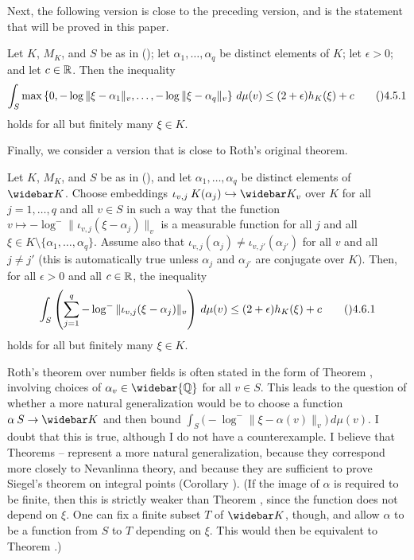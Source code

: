 Next, the following version is close to the preceding version, and is the
statement that will be proved in this paper.

  Let $K$, $M_K$, and $S$ be as in ();
let $\alpha_1,\dots,\alpha_q$ be distinct elements of $K$;
let $\epsilon>0$; and let $c\in\Bbb R$.  Then the inequality
$$\int_S \max\left\{0,
    -\log\|\xi-\alpha_1\|_v,\dots,-\log\|\xi-\alpha_q\|_v\right\}\,d\mu(v)
  \le (2+\epsilon)h_K(\xi) + c\tag\04.5.1$$
holds for all but finitely many $\xi\in K$.
\endit

Finally, we consider a version that is close to Roth's original theorem.

  Let $K$, $M_K$, and $S$ be as in (),
and let $\alpha_1,\dots,\alpha_q$ be distinct elements of $\widebar K$.
Choose embeddings $\iota_{v,j}\:K(\alpha_j)\hookrightarrow \widebar K_v$
over $K$ for all $j=1,\dots,q$ and all $v\in S$ in such a way that
the function $v\mapsto-\log^{-}\|\iota_{v,j}(\xi-\alpha_j)\|_v$
is a measurable function for all $j$ and all
$\xi\in K\setminus\{\alpha_1,\dots,\alpha_q\}$.  Assume also that
$\iota_{v,j}(\alpha_j)\ne \iota_{v,j'}(\alpha_{j'})$ for all $v$
and all $j\ne j'$ (this is automatically true unless $\alpha_j$
and $\alpha_{j'}$ are conjugate over $K$).
Then, for all $\epsilon>0$ and all $c\in\Bbb R$, the inequality
$$\int_S \left(\sum_{j=1}^q -\log^{-}\|\iota_{v,j}(\xi-\alpha_j)\|_v\right)
    \,d\mu(v)
  \le (2+\epsilon)h_K(\xi) + c \tag\04.6.1$$
holds for all but finitely many $\xi\in K$.
\endit

  Roth's theorem over number fields is often stated in the form
of Theorem , involving choices of $\alpha_v\in\widebar{\Bbb Q}$
for all $v\in S$.  This leads to the question of whether
a more natural generalization would be to choose a function
$\alpha\:S\to\widebar K$ and then bound
$\int_S\bigl(-\log^{-}\|\xi-\alpha(v)\|_v\bigr)\,d\mu(v)$.
I doubt that this is true, although I do not have a counterexample.
I believe that Theorems -- represent a more natural generalization,
because they correspond more closely to Nevanlinna theory, and because they
are sufficient to prove Siegel's theorem on integral points (Corollary ).
(If the image of $\alpha$ is required to be finite, then this is strictly
weaker than Theorem , since the function does not depend on $\xi$.
One can fix a finite subset $T$ of $\widebar K$, though, and allow $\alpha$
to be a function from $S$ to $T$ depending on $\xi$.  This would then be
equivalent to Theorem .)
\endit

